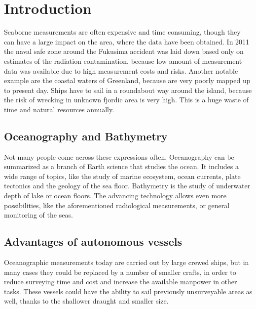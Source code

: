\section{Introduction}

Seaborne measurements are often expensive and time consuming, though they can have a large impact on the area, where the data have been obtained. In 2011 the naval safe zone around the Fukusima accident was laid down based only on estimates of the radiation contamination\cite{FNPP}, because low amount of measurement data was available due to high measurement costs and risks. Another notable example are the coastal waters of Greenland, because are very poorly mapped up to present day\cite{2009AGUFMOS21A1152W}. Ships have to sail in a roundabout way around the island, because the risk of wrecking in unknown fjordic area is very high. This is a huge waste of time and natural resources annually.

\subsection*{Oceanography and Bathymetry}

Not many people come across these expressions often. Oceanography can be summarized as a branch of Earth science that studies the ocean. It includes a wide range of topics, like the study of marine ecosystem, ocean currents, plate tectonics and the geology of the sea floor. Bathymetry is the study of underwater depth of lake or ocean floors. The advancing technology allows even more possibilities, like the aforementioned radiological measurements, or general monitoring of the seas.

\subsection{Advantages of autonomous vessels}

Oceanographic measurements today are carried out by large crewed ships, but in many cases they could be replaced by a number of smaller crafts, in order to reduce surveying time and cost and increase the available manpower in other tasks. These vessels could have the ability to sail previously unsurveyable areas as well, thanks to the shallower draught and smaller size.

